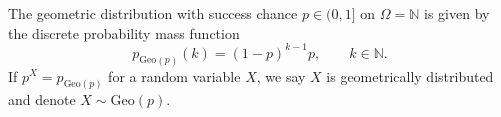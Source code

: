 \begin{definition}
    
\end{definition}

\begin{definition}
    
\end{definition}

\begin{definition}
    The geometric distribution with success chance \(p \in (0, 1]\) on \(\Omega = \mathbb{N}\) is given by the discrete probability mass function
    \begin{equation}
        p_{\text{Geo}(p)} (k) = (1 - p)^{k - 1} p, \qquad k \in \mathbb{N}\text{.}
    \end{equation}
    If \(p^X = p_{\text{Geo}(p)}\) for a random variable \(X\), we say \(X\) is geometrically distributed and denote \(X \sim \text{Geo}(p)\).
\end{definition}

\begin{definition}
    
\end{definition}

\begin{theorem}
    
\end{theorem}
